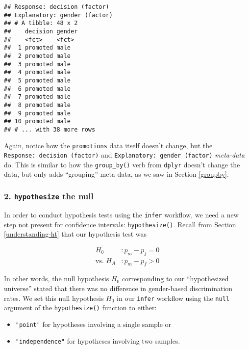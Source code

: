 \documentclass[
]{book}
\providecommand{\tightlist}{%
  \setlength{\itemsep}{0pt}\setlength{\parskip}{0pt}}
\begin{document}
\begin{verbatim}
## Response: decision (factor)
## Explanatory: gender (factor)
## # A tibble: 48 x 2
##    decision gender
##    <fct>    <fct> 
##  1 promoted male  
##  2 promoted male  
##  3 promoted male  
##  4 promoted male  
##  5 promoted male  
##  6 promoted male  
##  7 promoted male  
##  8 promoted male  
##  9 promoted male  
## 10 promoted male  
## # ... with 38 more rows
\end{verbatim}

Again, notice how the \texttt{promotions} data itself doesn't change, but the \texttt{Response:\ decision\ (factor)} and \texttt{Explanatory:\ gender\ (factor)} \emph{meta-data} do. This is similar to how the \texttt{group\_by()} verb from \texttt{dplyr} doesn't change the data, but only adds ``grouping'' meta-data, as we saw in Section \ref{groupby}.

\hypertarget{hypothesize-the-null}{%
\subsubsection*{\texorpdfstring{2. \texttt{hypothesize} the null}{2. hypothesize the null}}\label{hypothesize-the-null}}

In order to conduct hypothesis tests using the \texttt{infer} workflow, we need a new step not present for confidence intervals:  \texttt{hypothesize()}. Recall from Section \ref{understanding-ht} that our hypothesis test was

\[
\begin{aligned}
H_0 &: p_{m} - p_{f} = 0\\
\text{vs. } H_A&: p_{m} - p_{f} > 0
\end{aligned}
\]

In other words, the null hypothesis \(H_0\) corresponding to our ``hypothesized universe'' stated that there was no difference in gender-based discrimination rates. We set this null hypothesis \(H_0\) in our \texttt{infer} workflow using the \texttt{null} argument of the \texttt{hypothesize()} function to either:

\begin{itemize}
\tightlist
\item
  \texttt{"point"} for hypotheses involving a single sample or
\item
  \texttt{"independence"} for hypotheses involving two samples.
\end{itemize}
\end{document}
